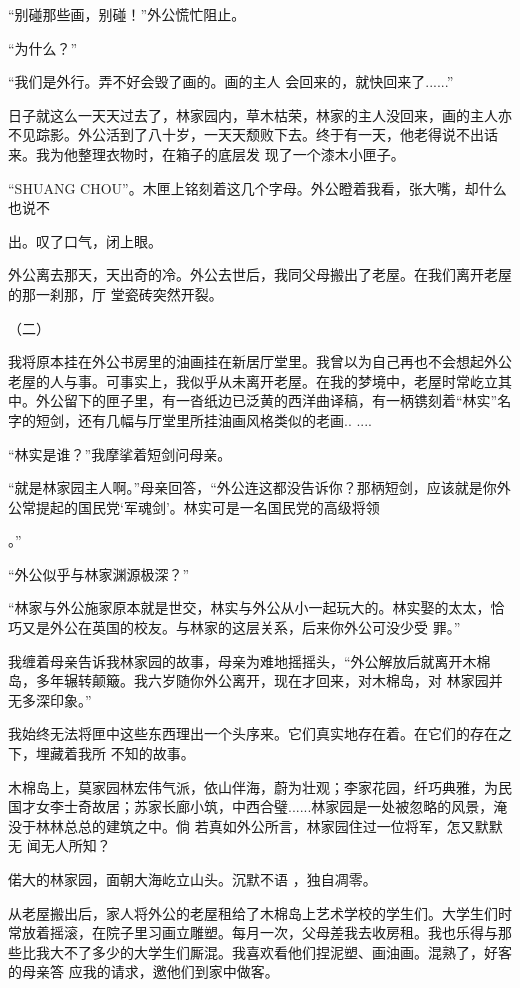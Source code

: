 \documentclass{article}
\begin{document}
“别碰那些画，别碰！”外公慌忙阻止。 


“为什么？” 

“我们是外行。弄不好会毁了画的。画的主人
会回来的，就快回来了......” 

日子就这么一天天过去了，林家园内，草木枯荣，林家的主人没回来，画的主人亦不见踪影。外公活到了八十岁，一天天颓败下去。终于有一天，他老得说不出话来。我为他整理衣物时，在箱子的底层发
现了一个漆木小匣子。 

“SHUANG CHOU”。木匣上铭刻着这几个字母。外公瞪着我看，张大嘴，却什么也说不

\newpage
出。叹了口气，闭上眼。 

外公离去那天，天出奇的冷。外公去世后，我同父母搬出了老屋。在我们离开老屋的那一刹那，厅
堂瓷砖突然开裂。 


（二） 

我将原本挂在外公书房里的油画挂在新居厅堂里。我曾以为自己再也不会想起外公老屋的人与事。可事实上，我似乎从未离开老屋。在我的梦境中，老屋时常屹立其中。外公留下的匣子里，有一沓纸边已泛黄的西洋曲译稿，有一柄镌刻着“林实”名字的短剑，还有几幅与厅堂里所挂油画风格类似的老画..
.... 


“林实是谁？”我摩挲着短剑问母亲。 

“就是林家园主人啊。”母亲回答，“外公连这都没告诉你？那柄短剑，应该就是你外公常提起的国民党‘军魂剑’。林实可是一名国民党的高级将领

\newpage
。” 


“外公似乎与林家渊源极深？” 

“林家与外公施家原本就是世交，林实与外公从小一起玩大的。林实娶的太太，恰巧又是外公在英国的校友。与林家的这层关系，后来你外公可没少受
罪。” 

我缠着母亲告诉我林家园的故事，母亲为难地摇摇头，“外公解放后就离开木棉岛，多年辗转颠簸。我六岁随你外公离开，现在才回来，对木棉岛，对
林家园并无多深印象。” 

我始终无法将匣中这些东西理出一个头序来。它们真实地存在着。在它们的存在之下，埋藏着我所
不知的故事。 

木棉岛上，莫家园林宏伟气派，依山伴海，蔚为壮观；李家花园，纤巧典雅，为民国才女李士奇故居；苏家长廊小筑，中西合璧......林家园是一处被忽略的风景，淹没于林林总总的建筑之中。倘
\newpage
若真如外公所言，林家园住过一位将军，怎又默默无
闻无人所知？ 

偌大的林家园，面朝大海屹立山头。沉默不语
，独自凋零。 

从老屋搬出后，家人将外公的老屋租给了木棉岛上艺术学校的学生们。大学生们时常放着摇滚，在院子里习画立雕塑。每月一次，父母差我去收房租。我也乐得与那些比我大不了多少的大学生们厮混。我喜欢看他们捏泥塑、画油画。混熟了，好客的母亲答
应我的请求，邀他们到家中做客。 
\end{document}
